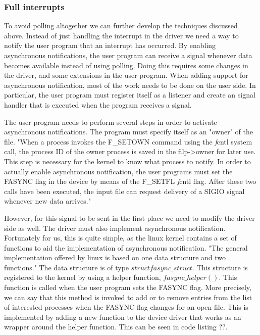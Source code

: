 \subsubsection{Full interrupts}
To avoid polling altogether we can further develop the techniques discussed above. Instead of just handling the interrupt in the driver we need a way to notify the user program that an interrupt has occurred. By enabling asynchronous notifications, the user program can receive a signal whenever data becomes available instead of using polling. Doing this requires some changes in the driver, and some extensions in the user program. When adding support for asynchronous notification, most of the work needs to be done on the user side. In particular, the user program must register itself as a listener and create an signal handler that is executed when the program receives a signal. 

The user program needs to perform several steps in order to activate asynchronous notifications. The program must specify itself as an "owner" of the file. "When a process invokes the F\_SETOWN command using the {\emph fcntl} system call, the process ID of the owner process is saved in the filp->owner for later use. This step is necessary for the kernel to know what process to notify. In order to actually enable asynchronous notification, the user programs must set the FASYNC flag in the device by means of the F\_SETFL {\emph fcntl} flag. After these two calls have been executed, the input file can request delivery of a SIGIO signal whenever new data arrives."

However, for this signal to be sent in the first place we need to modify the driver side as well. The driver must also implement asynchronous notification. Fortunately for us, this is quite simple, as the linux kernel contains a set of functions to aid the implementation of asynchronous notification. "The general implementation offered by linux is based on one data structure and two functions." The data structure is of type $struct fasync\_struct$. This structure  is registered to the kernel by using a helper function, $fasync\_helper()$. This function is called when the user program sets the FASYNC flag. More precisely, we can say that this method is invoked to add or to remove entries from the list of interested processes when the FASYNC flag changes for an open file. This is implemented by adding a new function to the device driver that works as an wrapper around the helper function. This can be seen in code listing ??.

